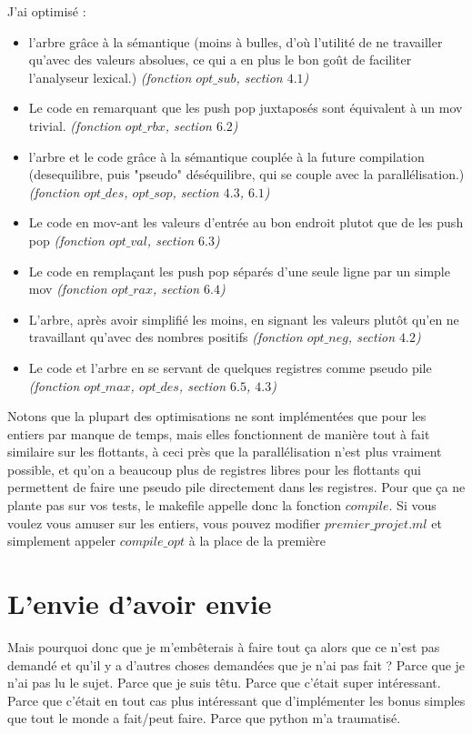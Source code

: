 \documentclass{article}
\begin{document}
J'ai optimisé :\begin{itemize}
\item l'arbre grâce à la sémantique (moins à bulles, d'où l'utilité de ne travailler qu'avec des valeurs absolues, ce qui a en plus le bon goût de faciliter l'analyseur lexical.) {\footnotesize \emph{(fonction $opt\_sub$, section $4.1$)}}
\item Le code en remarquant que les push pop juxtaposés sont équivalent à un mov trivial. {\footnotesize \emph{(fonction $opt\_rbx$, section $6.2$)}}
\item l'arbre  et le code grâce à la sémantique couplée à la future compilation (desequilibre, puis "pseudo" déséquilibre, qui se couple avec la parallélisation.) {\footnotesize \emph{(fonction $opt\_des$, $opt\_sop$, section $4.3$, $6.1$)}}
\item Le code en mov-ant les valeurs d'entrée au bon endroit plutot que de les push pop {\footnotesize \emph{(fonction $opt\_val$, section $6.3$)}}
\item Le code en remplaçant les push pop séparés d'une seule ligne par un simple mov {\footnotesize \emph{(fonction $opt\_rax$, section $6.4$)}}
\item L'arbre, après avoir simplifié les moins, en signant les valeurs plutôt qu'en ne travaillant qu'avec des nombres positifs {\footnotesize \emph{(fonction $opt\_neg$, section $4.2$)}}
\item Le code et l'arbre en se servant de quelques registres comme pseudo pile {\footnotesize \emph{(fonction $opt\_max$, $opt\_des$, section $6.5$, $4.3$)}}
\end{itemize}

Notons que la plupart des optimisations ne sont implémentées que pour les entiers par manque de temps, mais elles fonctionnent de manière tout à fait similaire sur les flottants, à ceci près que la parallélisation n'est plus vraiment possible, et qu'on a beaucoup plus de registres libres pour les flottants qui permettent de faire une pseudo pile directement dans les registres. Pour que ça ne plante pas sur vos tests, le makefile appelle donc la fonction $compile$. Si vous voulez vous amuser sur les entiers, vous pouvez modifier $premier\_projet.ml$ et simplement appeler $compile\_opt$ à la place de la première

\section{L'envie d'avoir envie}
Mais pourquoi donc que je m'embêterais à faire tout ça alors que ce n'est pas demandé et qu'il y a d'autres choses demandées que je n'ai pas fait ?
{\tiny\newline
Parce que je n'ai pas lu le sujet.\newline
Parce que je suis têtu.\newline
Parce que c'était super intéressant.\newline
Parce que c'était en tout cas plus intéressant que d'implémenter les bonus simples que tout le monde a fait/peut faire.\newline
Parce que python m'a traumatisé.}
\end{document}
